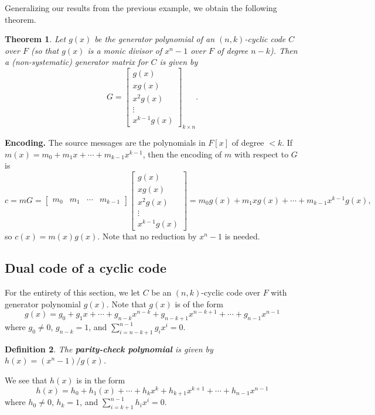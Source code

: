 \documentclass[10pt]{article}
\theoremstyle{newstyle}
\newtheorem{thm}{Theorem}[subsection]
\newtheorem{defn}[thm]{Definition}
\begin{document}
Generalizing our results from the previous example, we obtain the following theorem. 

\begin{thm}
Let $g(x)$ be the generator polynomial of an $(n, k)$-cyclic code $C$ over $F$ (so that 
$g(x)$ is a monic divisor of $x^n-1$ over $F$ of degree $n-k$). Then 
a (non-systematic) generator matrix for $C$ is given by 
\[ G = \begin{bmatrix}
g(x) \\
xg(x) \\
x^2g(x) \\
\vdots \\
x^{k-1}g(x) \end{bmatrix}_{k\times n}. \]
\end{thm}

{\bf Encoding.} The source messages are the polynomials in $F[x]$ of degree $<k$. 
If $m(x) = m_0 + m_1x + \cdots + m_{k-1} x^{k-1}$, then the encoding of $m$ with 
respect to $G$ is 
\[ c = mG = \begin{bmatrix} m_0 & m_1 & \cdots & m_{k-1} \end{bmatrix} 
\begin{bmatrix}
g(x) \\
xg(x) \\
x^2g(x) \\
\vdots \\
x^{k-1}g(x) \end{bmatrix} = m_0 g(x) + m_1 xg(x) + \cdots + m_{k-1} x^{k-1} g(x), \]
so $c(x) = m(x)g(x)$. Note that no reduction by $x^n - 1$ is needed. 

\subsection{Dual code of a cyclic code}

For the entirety of this section, we let $C$ be an $(n, k)$-cyclic code over $F$ with 
generator polynomial $g(x)$. Note that $g(x)$ is of the form 
\[ g(x) = g_0 + g_1x + \cdots + g_{n-k}x^{n-k} + g_{n-k+1} x^{n-k+1} + \cdots + g_{n-1} x^{n-1} \]
where $g_0 \neq 0$, $g_{n-k} = 1$, and $\sum_{i=n-k+1}^{n-1} g_i x^i = 0$. 

\begin{defn}
The {\bf parity-check polynomial} is given by $h(x) = (x^n - 1)/g(x)$. 
\end{defn}

We see that $h(x)$ is in the form 
\[ h(x) = h_0 + h_1(x) + \cdots + h_k x^k + h_{k+1} x^{k+1} + \cdots + h_{n-1} x^{n-1} \] 
where $h_0 \neq 0$, $h_k = 1$, and $\sum_{i=k+1}^{n-1} h_i x^i = 0$. 
\end{document}
